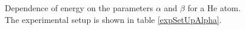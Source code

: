 \begin{figure}[!hbt]
    \begin{center}
      \caption{Dependence of energy on the parameters $\alpha$ and $\beta$ for a He atom. The experimental setup is shown in table \ref{expSetUpAlpha}.}
      \label{alphaBetaHe}
    \end{center}
  \end{figure}

